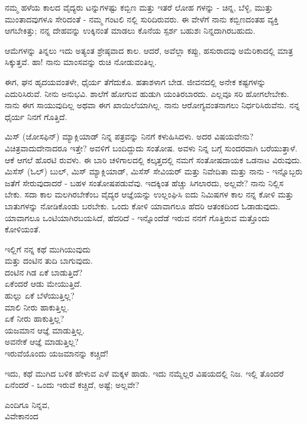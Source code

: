 ನಮ್ಮ ಹಳೆಯ ಕಾಲದ ವೈದ್ಯರು ಟನ್ನುಗಳಷ್ಟು ಕಬ್ಬಿಣ ಮತ್ತು ಇತರೆ ಲೋಹ ಗಳನ್ನು - ಚಿನ್ನ, ಬೆಳ್ಳಿ, ಮುತ್ತು ಮುಂತಾದವುಗಳೂ ಸೇರಿದಂತೆ - ನಮ್ಮ ಗಂಟಲಿ ನಲ್ಲಿ ಸುರಿದಿರುವರು. ಈ ವೇಳೆಗೆ ನಾನು ಕಬ್ಬಿಣದಂತಹ ವ್ಯಕ್ತಿ ಆಗಬೇಕಿತ್ತು; ನನ್ನ ದೇಹವನ್ನು ಉಕ್ಕಿನಂತೆ ಮಾಡಲು ಕೊನೆಯ ಸ್ಪರ್ಶ ಬಹುಶಃ ನಿನ್ನದಾಗಿರಬಹುದು.

ಆಮೆಗಳನ್ನು ತಿನ್ನಲು ಇದು ಅತ್ಯಂತ ಶ್ರೇಷ್ಠವಾದ ಕಾಲ. ಆದರೆ, ಅವೆಲ್ಲಾ ಕಪ್ಪು, ಹಸುರಾದವು ಅಮೆರಿಕಾದಲ್ಲಿ ಮಾತ್ರ ಸಿಕ್ಕುತ್ತವೆ. ಹಾ! ನಾನು ಮಾಂಸವನ್ನು ರುಚಿ ನೋಡುವಂತಿಲ್ಲ.

ಈಗ, ಘನ ಹೃದಯವಂತಳೇ, ಧೈರ್ಯ ತೆಗೆದುಕೊ. ಹತಾಶಳಾಗ ಬೇಡ. ಜೀವನದಲ್ಲಿ ಅನೇಕ ಕಷ್ಟಗಳನ್ನು ಎದುರಿಸಿರುವೆ. ನೀನು ಅನುಭವಿ. ಶಾಲೆಗೆ ಹೋಗುವ ಹುಡುಗಿ ಯಂತಿರಬಾರದು. ಎಲ್ಲವೂ ಸರಿ ಹೋಗಲೇಬೇಕು. ನಾನು ಈಗ ಸಾಯುವುದಿಲ್ಲ ಅಥವಾ ಈಗ ಖಾಯಿಲೆಯಾಗಿಲ್ಲ. ನಾನು ಆರೋಗ್ಯವಂತನಾಗಲು ನಿರ್ಧರಿಸಿರುವೆನು. ನನ್ನ ಧೈರ್ಯ ನಿನಗೆ ಗೊತ್ತಿದೆ.

ಮಿಸ್ (ಜೋಸಫಿನ್) ಮ್ಯಾಕ್ಲಿಯಾಡ್ ನಿನ್ನ ಪತ್ರವನ್ನು ನಿನಗೆ ಕಳುಹಿಸಿದಳು. ಅದರ ವಿಷಯವೇನು? ವಿಚಿತ್ರವಾದುದೇನಾದರೂ ಇತ್ತೇ? ಅವಳಿಗೆ ಬಂದಿದ್ದುದು ಸಂತೋಷ. ಅವಳು ನಿನ್ನ ಬಗ್ಗೆ ಸುಂದರವಾಗಿ ಬರೆಯುತ್ತಾಳೆ. ಆಕೆ ಆಗಲೆ ಹೊರಟಿ ರುವಳು. ಈ ಬಾರಿ ಚಳಿಗಾಲದಲ್ಲಿ ಕಲ್ಕತ್ತದಲ್ಲಿ ನಮಗೆ ಸಂತೋಷದಾಯಕ ಒಡನಾಟ ವಿರುವುದು. ಮಿಸೆಸ್ (ಓಲ್) ಬುಲ್, ಮಿಸ್ ಮ್ಯಾಕ್ಲಿಯಾಡ್, ಮಿಸೆಸ್ ಸೇವಿಯರ್ ಮತ್ತು ನಿವೇದಿತಾ ಮತ್ತು ನಾನು - ಇನ್ನೊಬ್ಬರು ಜತೆಗೆ ಸೇರುವುದಾದರೆ - ಬಹಳ ಸಂತೋಷಪಡುವೆವು. ಇದಕ್ಕಿಂತ ಹೆಚ್ಚು ಸಿಗಲಾರದು, ಅಲ್ಲವೇ? ನಾನು ನಿಲ್ಲಿಸ ಬೇಕು. ಸದಾ ಕಾಲ ಮಲಗಿರಬೇಕೆಂಬ ವೈದ್ಯರ ಆಜ್ಞೆಯನ್ನು ಉಲ್ಲಂಘಿಸಿ ಐದು ನಿಮಿಷಗಳ ಕಾಲ ನನ್ನ ಕೋಳಿ ಮತ್ತು ಬಾತುಗಳನ್ನು ನೋಡಿಕೊಂಡು ಬರಬೇಕು. ಒಂದು ಕೋಳಿ ಯಾವಾಗಲೂ ಹೆದರಿ ಆತಂಕದಿಂದ ಓಡಾಡುವುದು. ಯಾವಾಗಲೂ ಒಂಟಿಯಾಗಿರಬಯಸಿದೆ, ಹೆದರಿದೆ - ಇನ್ನೊಂದೆಡೆ ಇರುವ ನನಗೆ ಗೊತ್ತಿರುವ ಮತ್ತೊಂದು ಕೋಳಿಯಂತೆ.

\begin{myquote}
ಇಲ್ಲಿಗೆ ನನ್ನ ಕಥೆ ಮುಗಿಯುವುದು\\ಮತ್ತು ದಂಟಿನ ತುದಿ ಬಾಗುವುದು.\\ದಂಟಿನ ಗಿಡ ಏಕೆ ಬಾಡುತ್ತಿದೆ?\\ಏಕೆಂದರೆ ಆಡು ಮೇಯುತ್ತಿದೆ.\\ಹುಲ್ಲು ಏಕೆ ಬೆಳೆಯುತ್ತಿಲ್ಲ?\\ಮಾಲಿ ನೀರು ಹಾಕುತ್ತಿಲ್ಲ.\\ಏಕೆ ನೀರು ಹಾಕುತ್ತಿಲ್ಲ?\\ಯಜಮಾನ ಆಜ್ಞೆ ಮಾಡುತ್ತಿಲ್ಲ.\\ಅವನೇಕೆ ಆಜ್ಞೆ ಮಾಡುತ್ತಿಲ್ಲ?\\ಇರುವೆಯೊಂದು ಯಜಮಾನನ್ನು ಕಚ್ಚಿದೆ!
\end{myquote}

ಇದು, ಕಥೆ ಮುಗಿದ ಬಳಿಕ ಹೇಳುವ ಎಳೆ ಮಕ್ಕಳ ಹಾಡು. ಇದು ನಮ್ಮೆಲ್ಲರ ವಿಷಯದಲ್ಲಿ ನಿಜ. ಇಲ್ಲಿ ತೊಂದರೆ ಏನೆಂದರೆ - ಒಂದು ಇರುವೆ ಕಚ್ಚಿದೆ, ಅಷ್ಟೆ; ಅಲ್ಲವೇ?

\begin{flushright}
ಎಂದಿಗೂ ನಿನ್ನವ,\\ವಿವೇಕಾನಂದ
\end{flushright}


